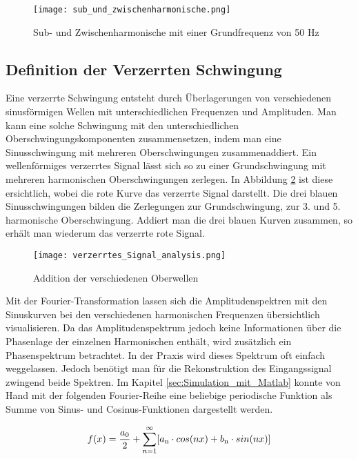 \begin{figure}[ht!]
	\centering
	\texttt{[image: sub\_und\_zwischenharmonische.png]}	
	\caption{Sub- und Zwischenharmonische mit einer Grundfrequenz von 50 Hz}
	\label{fig:Sub und Zwischenharmonische}
\end{figure}



\subsection{Definition der Verzerrten Schwingung}\label{sec:Verzerrte_Schwingung}
Eine verzerrte Schwingung entsteht durch Überlagerungen von verschiedenen sinusförmigen Wellen mit unterschiedlichen Frequenzen und Amplituden. Man kann eine solche Schwingung mit den unterschiedlichen Oberschwingungskomponenten zusammensetzen, indem man eine Sinusschwingung mit mehreren Oberschwingungen zusammenaddiert. Ein wellenförmiges verzerrtes Signal lässt sich so zu einer Grundschwingung mit mehreren harmonischen Oberschwingungen zerlegen. In Abbildung \ref{fig:Addition Oberwellen} ist diese ersichtlich, wobei die rote Kurve das verzerrte Signal darstellt. Die drei blauen Sinusschwingungen bilden die Zerlegungen zur Grundschwingung, zur 3. und 5. harmonische Oberschwingung. Addiert man die drei blauen Kurven zusammen, so erhält man wiederum das verzerrte rote Signal.

\begin{figure}[ht!]
	\centering
	\texttt{[image: verzerrtes\_Signal\_analysis.png]}	
	\caption{Addition der verschiedenen Oberwellen \cite{analysi3}}\label{fig:Addition Oberwellen}
\end{figure}

Mit der Fourier-Transformation lassen sich die Amplitudenspektren mit den Sinuskurven bei den verschiedenen harmonischen Frequenzen übersichtlich visualisieren. Da das Amplitudenspektrum jedoch keine Informationen über die Phasenlage der einzelnen Harmonischen enthält, wird zusätzlich ein Phasenspektrum betrachtet. In der Praxis wird dieses Spektrum oft einfach weggelassen. Jedoch benötigt man für die Rekonstruktion des Eingangssignal zwingend beide Spektren. Im Kapitel \ref{sec:Simulation_mit_Matlab} konnte von Hand mit der folgenden Fourier-Reihe eine beliebige periodische Funktion als Summe von Sinus- und Cosinus-Funktionen dargestellt werden.

\begin{equation}
f(x) = {\frac{a\textsubscript{0}}{2}}+\sum_{n=1}^\infty[a\textsubscript{n} \cdot cos(nx)+b\textsubscript{n} \cdot sin(nx)]
\end{equation}


